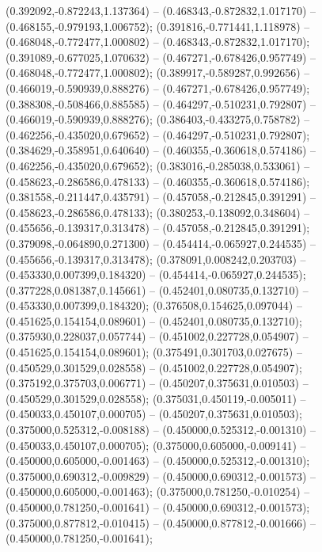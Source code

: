  (0.392092,-0.872243,1.137364) -- (0.468343,-0.872832,1.017170) -- (0.468155,-0.979193,1.006752);
 (0.391816,-0.771441,1.118978) -- (0.468048,-0.772477,1.000802) -- (0.468343,-0.872832,1.017170);
 (0.391089,-0.677025,1.070632) -- (0.467271,-0.678426,0.957749) -- (0.468048,-0.772477,1.000802);
 (0.389917,-0.589287,0.992656) -- (0.466019,-0.590939,0.888276) -- (0.467271,-0.678426,0.957749);
 (0.388308,-0.508466,0.885585) -- (0.464297,-0.510231,0.792807) -- (0.466019,-0.590939,0.888276);
 (0.386403,-0.433275,0.758782) -- (0.462256,-0.435020,0.679652) -- (0.464297,-0.510231,0.792807);
 (0.384629,-0.358951,0.640640) -- (0.460355,-0.360618,0.574186) -- (0.462256,-0.435020,0.679652);
 (0.383016,-0.285038,0.533061) -- (0.458623,-0.286586,0.478133) -- (0.460355,-0.360618,0.574186);
 (0.381558,-0.211447,0.435791) -- (0.457058,-0.212845,0.391291) -- (0.458623,-0.286586,0.478133);
 (0.380253,-0.138092,0.348604) -- (0.455656,-0.139317,0.313478) -- (0.457058,-0.212845,0.391291);
 (0.379098,-0.064890,0.271300) -- (0.454414,-0.065927,0.244535) -- (0.455656,-0.139317,0.313478);
 (0.378091,0.008242,0.203703) -- (0.453330,0.007399,0.184320) -- (0.454414,-0.065927,0.244535);
 (0.377228,0.081387,0.145661) -- (0.452401,0.080735,0.132710) -- (0.453330,0.007399,0.184320);
 (0.376508,0.154625,0.097044) -- (0.451625,0.154154,0.089601) -- (0.452401,0.080735,0.132710);
 (0.375930,0.228037,0.057744) -- (0.451002,0.227728,0.054907) -- (0.451625,0.154154,0.089601);
 (0.375491,0.301703,0.027675) -- (0.450529,0.301529,0.028558) -- (0.451002,0.227728,0.054907);
 (0.375192,0.375703,0.006771) -- (0.450207,0.375631,0.010503) -- (0.450529,0.301529,0.028558);
 (0.375031,0.450119,-0.005011) -- (0.450033,0.450107,0.000705) -- (0.450207,0.375631,0.010503);
 (0.375000,0.525312,-0.008188) -- (0.450000,0.525312,-0.001310) -- (0.450033,0.450107,0.000705);
 (0.375000,0.605000,-0.009141) -- (0.450000,0.605000,-0.001463) -- (0.450000,0.525312,-0.001310);
 (0.375000,0.690312,-0.009829) -- (0.450000,0.690312,-0.001573) -- (0.450000,0.605000,-0.001463);
 (0.375000,0.781250,-0.010254) -- (0.450000,0.781250,-0.001641) -- (0.450000,0.690312,-0.001573);
 (0.375000,0.877812,-0.010415) -- (0.450000,0.877812,-0.001666) -- (0.450000,0.781250,-0.001641);
